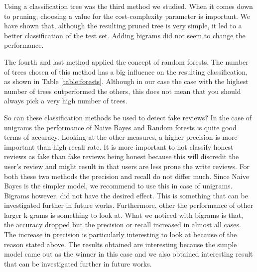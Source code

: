 \documentclass[a4paper,11pt]{article}
\begin{document}
Using a classification tree was the third method we studied. When it comes down to pruning, choosing a value for the cost-complexity parameter is important. We have shown that, although the resulting pruned tree is very simple, it led to a better classification of the test set. Adding bigrams did not seem to change the performance.

The fourth and last method applied the concept of random forests. The number of trees chosen of this method has a big influence on the resulting classification, as shown in Table \ref{table:forests}. Although in our case  the case with the highest number of trees outperformed the others, this does not mean that you should always pick a very high number of trees.

So can these classification methods be used to detect fake reviews? In the case of unigrams the performance of Naive Bayes and Random forests is quite good terms of accuracy. Looking at the other measures, a higher precision is more important than high recall rate. It is more important to not classify honest reviews as fake than fake reviews being honest because this will discredit the user's review and might result in that users are less prone the write reviews. For both these two methods the precision and recall do not differ much. Since Naive Bayes is the simpler model, we recommend to use this in case of unigrams. Bigrams however, did not have the desired effect. This is something that can be investigated further in future works. Furthermore, other the performance of other larger k-grams is something to look at. What we noticed with bigrams is that, the accuracy dropped but the precision or recall increased in almost all cases. The increase in precision is particularly interesting to look at because of the reason stated above. The results obtained are interesting because the simple model came out as the winner in this case and we also obtained interesting result that can be investigated further in future works.




\end{document}
